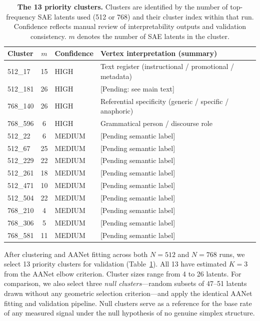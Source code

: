 \documentclass{article}
\begin{document}
\begin{table}[t]
  \centering
  \caption{%
    \textbf{The 13 priority clusters.}
    Clusters are identified by the number of top-frequency SAE latents used
    (512 or 768) and their cluster index within that run.  Confidence reflects
    manual review of interpretability outputs and validation consistency.
    $m$ denotes the number of SAE latents in the cluster.
  }
  \label{tab:priority_clusters}
  \begin{tabular}{lclll}
    \toprule
    Cluster & $m$ & Confidence & Vertex interpretation (summary) \\
    \midrule
    512\_17   & 15  & HIGH   & Text register (instructional / promotional / metadata) \\
    512\_181  & 26  & HIGH   & [Pending: see main text] \\
    768\_140  & 26  & HIGH   & Referential specificity (generic / specific / anaphoric) \\
    768\_596  & 6   & HIGH   & Grammatical person / discourse role \\
    \midrule
    512\_22   & 6   & MEDIUM & [Pending semantic label] \\
    512\_67   & 25  & MEDIUM & [Pending semantic label] \\
    512\_229  & 22  & MEDIUM & [Pending semantic label] \\
    512\_261  & 18  & MEDIUM & [Pending semantic label] \\
    512\_471  & 10  & MEDIUM & [Pending semantic label] \\
    512\_504  & 22  & MEDIUM & [Pending semantic label] \\
    768\_210  & 4   & MEDIUM & [Pending semantic label] \\
    768\_306  & 5   & MEDIUM & [Pending semantic label] \\
    768\_581  & 11  & MEDIUM & [Pending semantic label] \\
    \bottomrule
  \end{tabular}
\end{table}

After clustering and AANet fitting across both $N=512$ and $N=768$ runs, we select
13 priority clusters for validation (Table~\ref{tab:priority_clusters}).  All 13
have estimated $K=3$ from the AANet elbow criterion.  Cluster sizes range from 4 to
26 latents.  For comparison, we also select three \emph{null clusters}---random
subsets of 47--51 latents drawn without any geometric selection criterion---and
apply the identical AANet fitting and validation pipeline.  Null clusters serve as
a reference for the base rate of any measured signal under the null hypothesis of
no genuine simplex structure.
\end{document}
